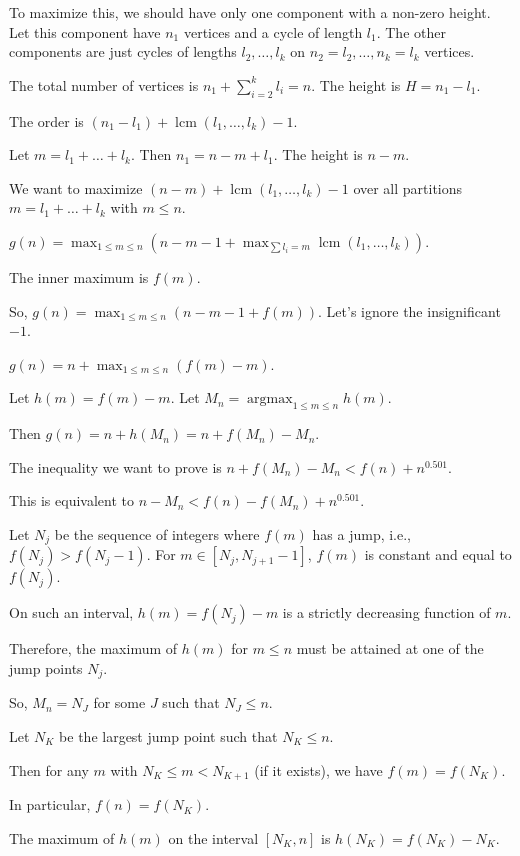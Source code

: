 \documentclass[12pt,a4paper]{article}
\theoremstyle{definition}
\begin{document}
    To maximize this, we should have only one component with a non-zero height. Let this component have $n_1$ vertices and a cycle of length $l_1$. The other components are just cycles of lengths $l_2, \dots, l_k$ on $n_2=l_2, \dots, n_k=l_k$ vertices.

    The total number of vertices is $n_1 + \sum_{i=2}^k l_i = n$. The height is $H=n_1-l_1$.

    The order is $(n_1-l_1) + \operatorname{lcm}(l_1, \dots, l_k)-1$.

    Let $m=l_1+\dots+l_k$. Then $n_1=n-m+l_1$. The height is $n-m$.

    We want to maximize $(n-m) + \operatorname{lcm}(l_1, \dots, l_k)-1$ over all partitions $m = l_1+\dots+l_k$ with $m \le n$.

    $g(n) = \max_{1 \le m \le n} \left(n-m-1 + \max_{\sum l_i=m} \operatorname{lcm}(l_1, \dots, l_k)\right)$.

    The inner maximum is $f(m)$.

    So, $g(n) = \max_{1 \le m \le n} (n-m-1+f(m))$. Let's ignore the insignificant $-1$.

    $g(n) = n + \max_{1 \le m \le n} (f(m)-m)$.

    Let $h(m) = f(m)-m$. Let $M_n = \operatorname{argmax}_{1 \le m \le n} h(m)$.

    Then $g(n) = n+h(M_n) = n+f(M_n)-M_n$.

    The inequality we want to prove is $n+f(M_n)-M_n < f(n)+n^{0.501}$.

    This is equivalent to $n-M_n < f(n)-f(M_n) + n^{0.501}$.

    Let $N_j$ be the sequence of integers where $f(m)$ has a jump, i.e., $f(N_j) > f(N_j-1)$. For $m \in [N_j, N_{j+1}-1]$, $f(m)$ is constant and equal to $f(N_j)$.

    On such an interval, $h(m)=f(N_j)-m$ is a strictly decreasing function of $m$.

    Therefore, the maximum of $h(m)$ for $m \le n$ must be attained at one of the jump points $N_j$.

    So, $M_n=N_J$ for some $J$ such that $N_J \le n$.

    Let $N_K$ be the largest jump point such that $N_K \le n$.

    Then for any $m$ with $N_K \le m < N_{K+1}$ (if it exists), we have $f(m)=f(N_K)$.

    In particular, $f(n)=f(N_K)$.

    The maximum of $h(m)$ on the interval $[N_K, n]$ is $h(N_K) = f(N_K)-N_K$.
\end{document}
